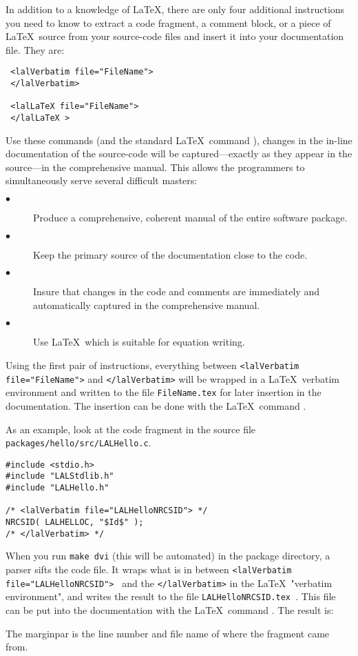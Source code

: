 \documentclass[oneside]{book}
\begin{document}
In addition to a knowledge of \LaTeX, there are only four additional
instructions you need to know to extract a code fragment, a comment block, or
a piece of \LaTeX\ source from your source-code files and insert it into your
documentation file.  They are:
\begin{verbatim}
 <lalVerbatim file="FileName"> 
 </lalVerbatim> 

 <lalLaTeX file="FileName"> 
 </lalLaTeX > 
\end{verbatim}
Use these commands (and the standard \LaTeX\ command \verb@@), changes
in the in-line documentation of the source-code will be captured---exactly as
they appear in the source---in the comprehensive manual.  This allows the
programmers to simultaneously serve several difficult masters:
\begin{description}
\item[$\bullet$ ] 
Produce a comprehensive, coherent manual of the entire software package.
\vspace*{-0.05in}
\item[$\bullet$ ] 
Keep the primary source of the documentation close to the code.
\item[$\bullet$] 
Insure that changes in the code and comments are immediately and automatically
captured in the comprehensive manual.
\item[$\bullet$ ] 
Use \LaTeX\ which is suitable for equation writing.
\vspace*{-0.051in}
\end{description}


Using the first pair of instructions, everything between
\texttt{<lalVerbatim file="FileName">} and \texttt{</lalVerbatim>} will be
wrapped in a \LaTeX\ verbatim environment and written to the file
\texttt{FileName.tex} for later insertion in the documentation.  The insertion
can be done with the \LaTeX\ command \verb@@.

As an example, look at the code fragment in the source file 
\texttt{packages/hello/src/LALHello.c}.
\begin{verbatim}
#include <stdio.h>
#include "LALStdlib.h"
#include "LALHello.h"

/* <lalVerbatim file="LALHelloNRCSID"> */
NRCSID( LALHELLOC, "$Id$" );
/* </lalVerbatim> */
\end{verbatim}
When you run \texttt{make dvi} (this will be automated) in the package
directory, a parser sifts the code file. It wraps what is in between
\texttt{<lalVerbatim file="LALHelloNRCSID"> } and the \texttt{</lalVerbatim>}
in the \LaTeX\ "verbatim environment", and writes the result to the file
\texttt{LALHelloNRCSID.tex }.  This file can be put into the documentation
with the \LaTeX\ command {\verb@@}. The result is: 

The marginpar is the line number and file name of where the fragment came
from.
\end{document}
